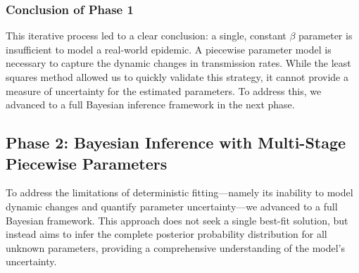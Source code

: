 \documentclass[12pt, a4paper]{article}
\begin{document}
\subsubsection{Conclusion of Phase 1}
This iterative process led to a clear conclusion: a single, constant $\beta$ parameter is insufficient to model a real-world epidemic. A piecewise parameter model is necessary to capture the dynamic changes in transmission rates. While the least squares method allowed us to quickly validate this strategy, it cannot provide a measure of uncertainty for the estimated parameters. To address this, we advanced to a full Bayesian inference framework in the next phase.

\subsection{Phase 2: Bayesian Inference with Multi-Stage Piecewise Parameters}
To address the limitations of deterministic fitting—namely its inability to model dynamic changes and quantify parameter uncertainty—we advanced to a full Bayesian framework. This approach does not seek a single best-fit solution, but instead aims to infer the complete posterior probability distribution for all unknown parameters, providing a comprehensive understanding of the model's uncertainty.
\end{document}
